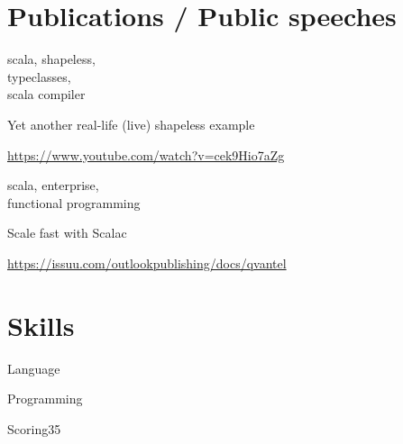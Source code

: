 \documentclass[a4paper,11pt]{cv4tw}%
\begin{document}
      \section{Publications / Public speeches}
      \label{Publications}
      {scala, shapeless,\\typeclasses,\\scala compiler}
      {Yet another real-life (live) shapeless example
        \begin{missions}
          \item \href{https://www.youtube.com/watch?v=cek9Hio7aZg}{https://www.youtube.com/watch?v=cek9Hio7aZg}
        \end{missions}
      }
      {scala, enterprise,\\functional programming}
      {Scale fast with Scalac
        \begin{missions}
          \item \href{https://issuu.com/outlookpublishing/docs/qvantel}{https://issuu.com/outlookpublishing/docs/qvantel}
        \end{missions}
      }

\section{Skills}
\begin{skills} {Language}
\end{skills}

\begin{skills}{Programming}
\end{skills}

\begin{fields}{Scoring}{3}{5}
\end{fields}

\end{document}
